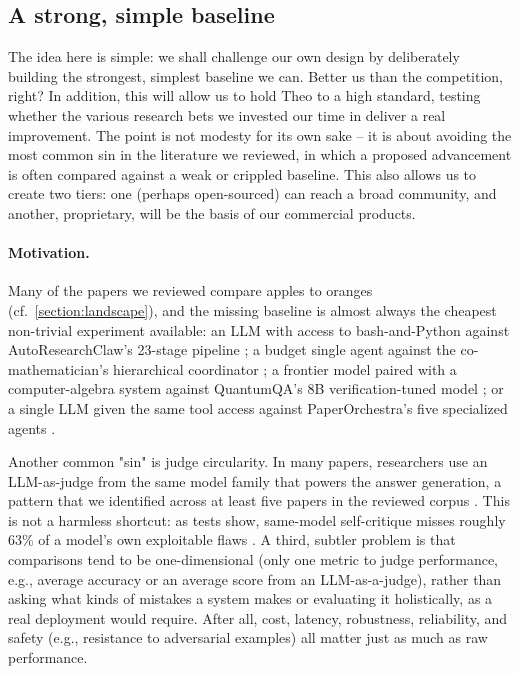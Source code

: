 
\subsection{A strong, simple baseline}
\label{arc:baseline}

\begin{summarybox}
    The idea here is simple: we shall challenge our own design by deliberately building the strongest, simplest baseline we can. Better us than the competition, right? In addition, this will allow us to hold Theo to a high standard, testing whether the various research bets we invested our time in deliver a real improvement.
    The point is not modesty for its own sake -- it is about avoiding the most common sin in the literature we reviewed, in which a proposed advancement is often compared against a weak or crippled baseline.
    This also allows us to create two tiers: one (perhaps open-sourced) can reach a broad community, and another, proprietary, will be the basis of our commercial products.
\end{summarybox}

\paragraph{Motivation.}
Many of the papers we reviewed compare apples to oranges (cf.\ \ref{section:landscape}), and the missing baseline is almost always the cheapest non-trivial experiment available: an LLM with access to bash-and-Python against AutoResearchClaw's 23-stage pipeline \cite{2605.20025}; a budget single agent against the co-mathematician's hierarchical coordinator \cite{2605.06651}; a frontier model paired with a computer-algebra system against QuantumQA's 8B verification-tuned model \cite{2604.18176}; or a single LLM given the same tool access against PaperOrchestra's five specialized agents \cite{2604.05018}.

Another common "sin" is judge circularity. In many papers, researchers use an LLM-as-judge from the same model family that powers the answer generation, a pattern that we identified across at least five papers in the reviewed corpus \cite{2405.17044, 2604.05018, 2604.24658, 2605.20025, Gottweis2026}. This is not a harmless shortcut: as tests show, same-model self-critique misses roughly 63\% of a model's own exploitable flaws \cite{2606.04075}. A third, subtler problem is that comparisons tend to be one-dimensional (only one metric to judge performance, e.g., average accuracy or an average score from an LLM-as-a-judge), rather than asking what kinds of mistakes a system makes or evaluating it holistically, as a real deployment would require. After all, cost, latency, robustness, reliability, and safety (e.g., resistance to adversarial examples) all matter just as much as raw performance.

